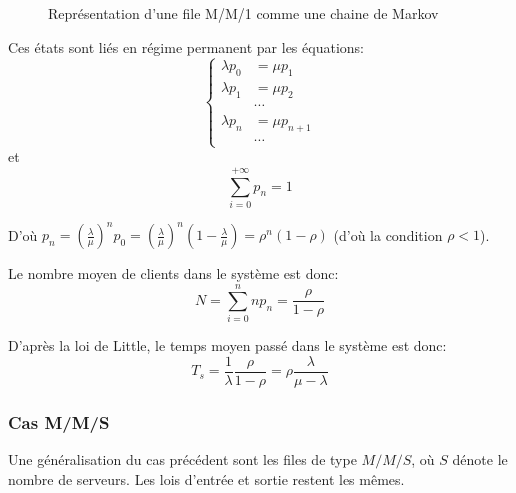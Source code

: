     \begin{figure}[h]
      \centering
      \caption{Représentation d'une file M/M/1 comme une chaine de Markov
        \cite{procstochs:cc}}
      \label{fig:markov1}
    \end{figure}

    Ces états sont liés en régime permanent par les équations:
      \[
        \left\{\begin{aligned}
          \lambda p_0 & = \mu p_1 \\
          \lambda p_1 & = \mu p_2 \\
          & \cdots \\
          \lambda p_n & = \mu p_{n+1} \\
          & \cdots 
        \end{aligned}\right.
      \]
    et
      \[
        \sum_{i=0}^{+\infty} p_n = 1
      \]

    D'où $p_n = \left(\frac \lambda \mu\right)^n p_0 =
     \left(\frac \lambda \mu\right)^n \left(1-\frac \lambda \mu\right) =
     \rho^n (1-\rho)$ (d'où la condition $\rho < 1$).

   Le nombre moyen de clients dans le système est donc:
     \[ N = \sum_{i=0}^n np_n = \frac \rho {1-\rho} \]

   D'après la loi de Little, le temps moyen passé dans le système est donc:
     \[
       T_s = \frac 1 \lambda \frac \rho {1-\rho}
           = \rho \frac \lambda {\mu-\lambda}
     \]

  \subsubsection{Cas M/M/S}
    Une généralisation du cas précédent sont les files de type $M/M/S$, où $S$
    dénote le nombre de serveurs. Les lois d'entrée et sortie restent les mêmes.

